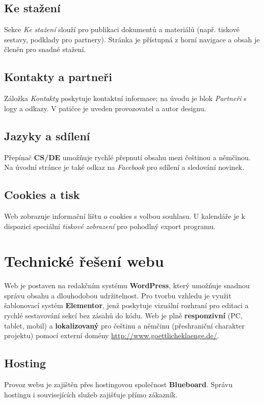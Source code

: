\documentclass[12pt,a4paper]{article}
\begin{document}
	\subsection{Ke stažení}
	Sekce \emph{Ke stažení} slouží pro publikaci dokumentů a materiálů (např. tiskové
	sestavy, podklady pro partnery). Stránka je přístupná z horní navigace a obsah
	je členěn pro snadné stažení.
	
	\subsection{Kontakty a partneři}
	Záložka \emph{Kontakty} poskytuje kontaktní informace; na úvodu je blok
	\emph{Partneři} s logy a odkazy. V patičce je uveden provozovatel a autor designu.
	
	\subsection{Jazyky a sdílení}
	Přepínač \textbf{CS/DE} umožňuje rychlé přepnutí obsahu mezi češtinou a němčinou.
	Na úvodní stránce je také odkaz na \emph{Facebook} pro sdílení a sledování novinek.
	
	\subsection{Cookies a tisk}
	Web zobrazuje informační lištu o cookies s volbou souhlasu.
	U kalendáře je k dispozici speciální \emph{tiskové zobrazení} pro pohodlný export programu.
	
	\newpage
	\section{Technické řešení webu}
	Web je postaven na redakčním systému \textbf{WordPress}, který umožňuje snadnou
	správu obsahu a dlouhodobou udržitelnost. Pro tvorbu vzhledu je využit
	šablonovací systém \textbf{Elementor}, jenž poskytuje vizuální rozhraní pro editaci
	a rychlé sestavování sekcí bez zásahů do kódu. Web je plně \textbf{responzivní}
	(PC, tablet, mobil) a \textbf{lokalizovaný} pro češtinu a němčinu
	(přeshraniční charakter projektu) pomocí externí domény \url{http://www.goettlicheklaenge.de/}.
	\subsection*{Hosting}
	Provoz webu je zajištěn přes hostingovou společnost \textbf{Blueboard}.
	Správu hostingu i souvisejících služeb zajišťuje přímo zákazník.
	
\end{document}
